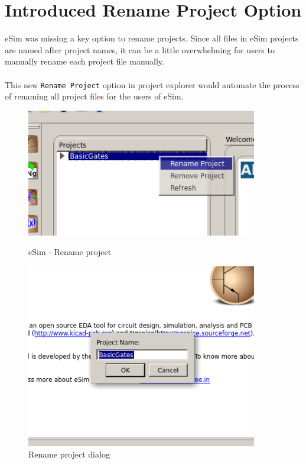 \documentclass[12pt,a4paper]{report}
\begin{document}
\section{Introduced Rename Project Option}
eSim was missing a key option to rename projects. Since all files in eSim projects are named after project names, it can be a little overwhelming for users to manually rename each project file manually.\\
\\
This new \texttt{Rename Project} option in project explorer would automate the process of renaming all project files for the users of eSim.\\
\begin{figure}[h]
	\centering
	\begin{minipage}{0.45\textwidth}
		\centering
		\includegraphics[width=0.9\textwidth]{esim6}
		\caption{eSim - Rename project}
	\end{minipage}\hfill
	\begin{minipage}{0.45\textwidth}
		\centering
		\includegraphics[width=0.9\textwidth]{esim5}
		\caption{Rename project dialog}
	\end{minipage}
\end{figure}
\\
\end{document}
